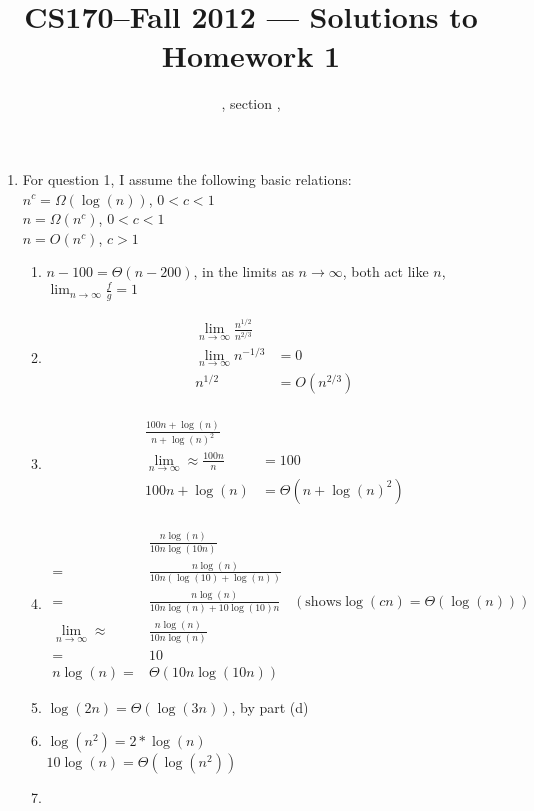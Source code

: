 \documentclass[11pt]{article}
\title{CS170--Fall 2012 --- Solutions to Homework 1}
\author{\Name, section \Sec, \texttt{\Login}}
\begin{document}
\maketitle

\begin{enumerate}
\item 

For question 1, I assume the following basic relations:\\
$n^c=\Omega(\log(n))$, $0<c<1$\\
$n = \Omega(n^c)$, $0<c<1$\\
$n = O(n^c)$, $c>1$\\


\begin{enumerate}

\item 
$n-100 = \Theta(n-200)$, in the limits as $n\to\infty$, both act like $n$, $\lim_{n\to\infty} \frac{f}{g}=1$
\item
\begin{align*}
\lim_{n\to\infty} \frac{n^{1/2}}{n^{2/3}}\\
\lim_{n\to\infty} n^{-1/3} &= 0\\
n^{1/2} &= O(n^{2/3})\\
\end{align*}
\item
\begin{align*}
\frac{100n+\log(n)}{n+\log(n)^2}&\\
\lim_{n\to\infty} \approx \frac{100n}{n} &= 100\\
100n + \log(n) &= \Theta(n + \log(n)^2)\\
\end{align*}
\item
\begin{align*}
&\frac{n\log(n)}{10n\log(10n)}\\
=&\frac{n\log(n)}{10n(\log(10)+\log(n))}\\
=&\frac{n\log(n)}{10n\log(n)+10\log(10)n}&(\text{shows} \log(cn)=\Theta(\log(n)))\\
\lim_{n\to\infty} \approx& \frac{n\log(n)}{10n\log(n)}\\
=&10\\
n\log(n)=&\Theta(10n\log(10n))
\end{align*}
\item
$\log(2n) = \Theta(\log(3n))$, by part (d)
\item
$\log(n^2)=2*\log(n)$\\
$10\log(n)=\Theta(\log(n^2))$
\item

\end{enumerate}
\end{enumerate}
\end{document}

